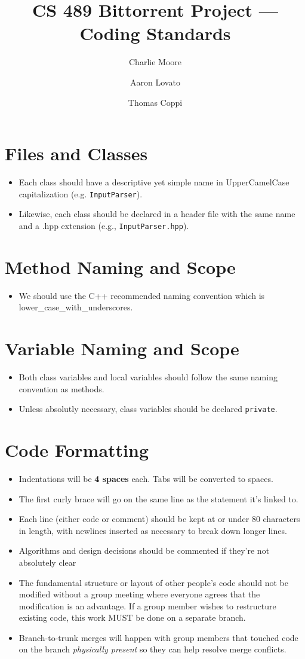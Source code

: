 \documentclass[11pt]{article}
\author{Charlie Moore \and Aaron Lovato \and Thomas Coppi}
\title{CS 489 Bittorrent Project --- Coding Standards}
\begin{document}
\section*{Files and Classes}
\begin{itemize}
\item Each class should have a descriptive yet simple name in UpperCamelCase
  capitalization (e.g.  \texttt{InputParser}).
\item Likewise, each class should be declared in a header file with the same
  name and a .hpp extension (e.g., \texttt{InputParser.hpp}).
\end{itemize}


\section*{Method Naming and Scope}
\begin{itemize}
\item We should use the C++ recommended naming convention which is
  lower\_\-case\_\-with\_\-underscores.
\end{itemize}


\section*{Variable Naming and Scope}
\begin{itemize}
\item Both class variables and local variables should follow the same naming
  convention as methods.
\item Unless absolutly necessary, class variables should be declared
  \texttt{private}.
\end{itemize}


\section*{Code Formatting}
\begin{itemize}
\item Indentations will be \textbf{4 spaces} each.  Tabs will be converted to
  spaces.
\item The first curly brace will go on the same line as the statement it's
  linked to.
\item Each line (either code or comment) should be kept at or under 80
  characters in length, with newlines inserted as necessary to break down longer
  lines.
\item Algorithms and design decisions should be commented if they're not
  absolutely clear
\item The fundamental structure or layout of other people's code should not be
  modified without a group meeting where everyone agrees that the modification
  is an advantage. If a group member wishes to restructure existing code, this
  work MUST be done on a separate branch.
\item Branch-to-trunk merges will happen with group members that touched code on
  the branch \textit{physically present} so they can help resolve merge conflicts.
\end{itemize}
\end{document}
